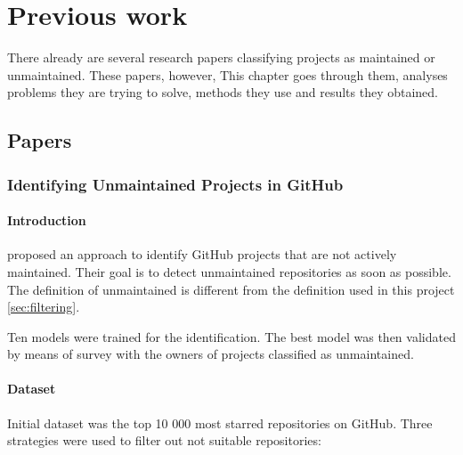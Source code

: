 
\chapter{Previous work}
\label{chap-1:review}


There already are several research papers classifying projects as maintained or unmaintained.
These papers, however, 
This chapter goes through them, analyses problems they are trying to solve, methods they use and results they obtained.

\section{Papers}

\subsection{Identifying Unmaintained Projects in GitHub}
\label{temp:paper1}

\subsubsection{Introduction}

\citeauthor{p:7} proposed an approach to identify GitHub projects that are not actively maintained.
Their goal is to detect unmaintained repositories as soon as possible.
The definition of unmaintained is different from the definition used in this project \ref{sec:filtering}.

Ten models were trained for the identification.
The best model was then validated by means of survey with the owners of projects classified as unmaintained.

\subsubsection{Dataset}

Initial dataset was the top 10 000 most starred repositories on GitHub.
Three strategies were used to filter out not suitable repositories:

